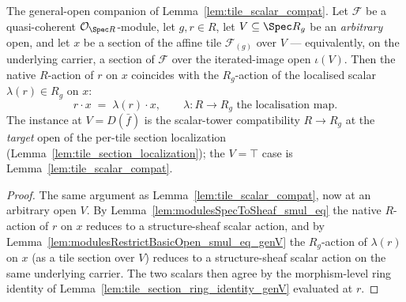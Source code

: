 \begin{lemma}\leanok
  \label{lem:tile_scalar_compat_genV}
  The general-open companion of Lemma~\ref{lem:tile_scalar_compat}. Let \(\mathcal{F}\) be a
  quasi-coherent \(\mathcal{O}_{\Spec R}\)-module, let \(g, r \in R\), let \(V \subseteq \Spec R_g\) be
  an \emph{arbitrary} open, and let \(x\) be a section of the affine tile \(\mathcal{F}_{(g)}\) over
  \(V\) --- equivalently, on the underlying carrier, a section of \(\mathcal{F}\) over the
  iterated-image open \(\iota(V)\). Then the native \(R\)-action of \(r\) on \(x\) coincides with the
  \(R_g\)-action of the localised scalar \(\lambda(r) \in R_g\) on \(x\):
  \[
    r \cdot x \;=\; \lambda(r) \cdot x,
    \qquad \lambda : R \to R_g \text{ the localisation map}.
  \]
  The instance at \(V = D(\bar f)\) is the scalar-tower compatibility \(R \to R_g\) at the \emph{target}
  open of the per-tile section localization (Lemma~\ref{lem:tile_section_localization}); the
  \(V = \top\) case is Lemma~\ref{lem:tile_scalar_compat}.
\end{lemma}
\begin{proof}
    \leanok
  The same argument as Lemma~\ref{lem:tile_scalar_compat}, now at an arbitrary open \(V\). By
  Lemma~\ref{lem:modulesSpecToSheaf_smul_eq} the native \(R\)-action of \(r\) on \(x\) reduces to a
  structure-sheaf scalar action, and by Lemma~\ref{lem:modulesRestrictBasicOpen_smul_eq_genV} the
  \(R_g\)-action of \(\lambda(r)\) on \(x\) (as a tile section over \(V\)) reduces to a structure-sheaf
  scalar action on the same underlying carrier. The two scalars then agree by the morphism-level ring
  identity of Lemma~\ref{lem:tile_section_ring_identity_genV} evaluated at \(r\).
\end{proof}

